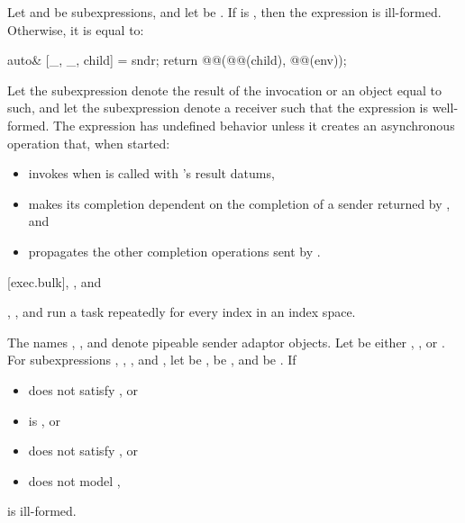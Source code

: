 \pnum
Let  and  be subexpressions, and
let  be .
If
is ,
then the expression 
is ill-formed.
Otherwise, it is equal to:
\begin{codeblock}
auto& [_, _, child] = sndr;
return @@(@@(child), @@(env));
\end{codeblock}

\pnum
Let the subexpression  denote
the result of the invocation  or
an object equal to such, and
let the subexpression  denote a receiver
such that the expression  is well-formed.
The expression  has undefined behavior
unless it creates an asynchronous operation that,
when started:
\begin{itemize}
\item
invokes  when  is called
with 's result datums,
\item
makes its completion dependent on
the completion of a sender returned by , and
\item
propagates the other completion operations sent by .
\end{itemize}

[exec.bulk]{, , and }

\pnum
{}, , and 
run a task repeatedly for every index in an index space.

\pnum
The names , , and 
denote pipeable sender adaptor objects.
Let  be either
, , or .
For subexpressions , , , and ,
let
 be ,
 be , and
 be .
If
\begin{itemize}
\item
{} does not satisfy , or
\item
{} is , or
\item
{} does not satisfy , or
\item
{} does not model ,
\end{itemize}
 is ill-formed.

